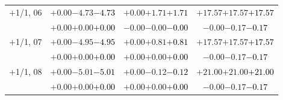 \documentclass[compress]{beamer}
\begin{document}
\begin{frame}
\begin{tabular}{r | c | c | c}
$+$1/1, 06 & $+0.00$\hspace{0.1 cm}$-4.73$\hspace{0.1 cm}\textcolor{black}{$-4.73$} & $+0.00$\hspace{0.1 cm}$+1.71$\hspace{0.1 cm}\textcolor{black}{$+1.71$} & $+17.57$\hspace{0.1 cm}$+17.57$\hspace{0.1 cm}\textcolor{black}{$+17.57$} \\
           & $+0.00$\hspace{0.1 cm}$+0.00$\hspace{0.1 cm}\textcolor{black}{$+0.00$} & $-0.00$\hspace{0.1 cm}$-0.00$\hspace{0.1 cm}\textcolor{black}{$-0.00$} & $-0.00$\hspace{0.1 cm}$-0.17$\hspace{0.1 cm}\textcolor{black}{$-0.17$} \\
$+$1/1, 07 & $+0.00$\hspace{0.1 cm}$-4.95$\hspace{0.1 cm}\textcolor{black}{$-4.95$} & $+0.00$\hspace{0.1 cm}$+0.81$\hspace{0.1 cm}\textcolor{black}{$+0.81$} & $+17.57$\hspace{0.1 cm}$+17.57$\hspace{0.1 cm}\textcolor{black}{$+17.57$} \\
           & $+0.00$\hspace{0.1 cm}$+0.00$\hspace{0.1 cm}\textcolor{black}{$+0.00$} & $+0.00$\hspace{0.1 cm}$+0.00$\hspace{0.1 cm}\textcolor{black}{$+0.00$} & $-0.00$\hspace{0.1 cm}$-0.17$\hspace{0.1 cm}\textcolor{black}{$-0.17$} \\
$+$1/1, 08 & $+0.00$\hspace{0.1 cm}$-5.01$\hspace{0.1 cm}\textcolor{black}{$-5.01$} & $+0.00$\hspace{0.1 cm}$-0.12$\hspace{0.1 cm}\textcolor{black}{$-0.12$} & $+21.00$\hspace{0.1 cm}$+21.00$\hspace{0.1 cm}\textcolor{black}{$+21.00$} \\
           & $+0.00$\hspace{0.1 cm}$+0.00$\hspace{0.1 cm}\textcolor{black}{$+0.00$} & $+0.00$\hspace{0.1 cm}$+0.00$\hspace{0.1 cm}\textcolor{black}{$+0.00$} & $-0.00$\hspace{0.1 cm}$-0.17$\hspace{0.1 cm}\textcolor{black}{$-0.17$} \\

\end{tabular}
\end{frame}
\end{document}
